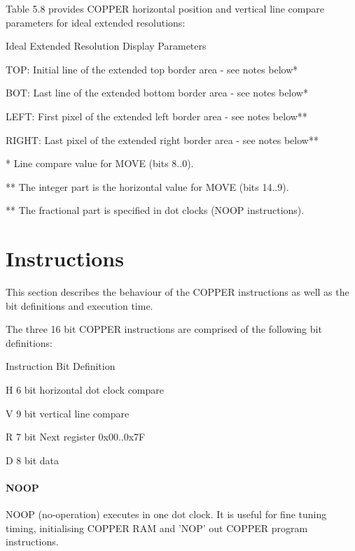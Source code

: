 Table 5.8 provides COPPER horizontal position and vertical
line compare parameters for ideal extended resolutions:

\begin{table}[h]\centering\small
  \caption{Ideal Extended Resolution Display Parameters}

  \raggedright TOP: Initial line of the extended top border area - see notes below*

  BOT: Last line of the extended bottom border area - see notes below*

  LEFT: First pixel of the extended left border area - see notes below**

  RIGHT: Last pixel of the extended right border area - see notes below**

  * Line compare value for MOVE (bits 8..0).

  ** The integer part is the horizontal value for MOVE (bits 14..9).

  ** The fractional part is specified in dot clocks (NOOP instructions).
\end{table}

\section{Instructions}

This section describes the behaviour of the COPPER instructions as
well as the bit definitions and execution time.

The three 16 bit COPPER instructions are comprised of the following
bit definitions:

\begin{table}[h]\centering
  \caption{Instruction Bit Definition}

  \raggedright H   6 bit horizontal dot clock compare

  V   9 bit vertical line compare

  R   7 bit Next register 0x00..0x7F

  D   8 bit data
\end{table}
\paragraph{NOOP}

NOOP (no-operation) executes in one dot clock. It is useful for fine
tuning timing, initialising COPPER RAM and 'NOP' out COPPER program
instructions.


